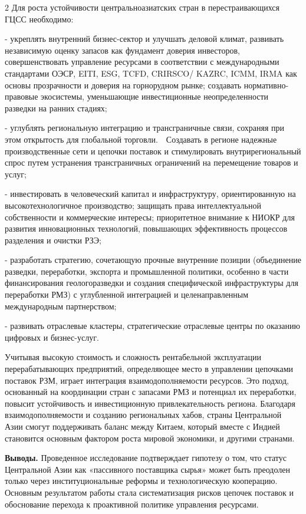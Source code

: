 \begin{multicols}{2}
Для роста устойчивости центральноазиатских стран в перестраивающихся
ГЦСС необходимо:

- укреплять внутренний бизнес-сектор и улучшать деловой климат,
развивать независимую оценку запасов как фундамент доверия инвесторов,
совершенствовать управление ресурсами в соответствии с международными
стандартами ОЭСР, EITI, ESG, TCFD, CRIRSCO/ KAZRC, ICMM, IRMA как основы
прозрачности и доверия на горнорудном рынке; создавать
нормативно-правовые экосистемы, уменьшающие инвестиционные
неопределенности разведки на ранних стадиях;

- углублять региональную интеграцию и трансграничные связи, сохраняя при
этом открытость для глобальной торговли.~~Создавать в регионе надежные
производственные сети и цепочки поставок и стимулировать
внутрирегиональный спрос путем устранения трансграничных ограничений на
перемещение товаров и услуг;

- инвестировать в человеческий капитал и инфраструктуру, ориентированную
на высокотехнологичное производство; защищать права интеллектуальной
собственности и коммерческие интересы; приоритетное внимание к НИОКР для
развития инновационных технологий, повышающих эффективность процессов
разделения и очистки РЗЭ;

- разработать стратегию, сочетающую прочные внутренние позиции
(объединение разведки, переработки, экспорта и промышленной политики,
особенно в части финансирования геологоразведки и создания специфической
инфраструктуры для переработки РМЗ) с углубленной интеграцией и
целенаправленным международным партнерством;

- развивать отраслевые кластеры, стратегические отраслевые центры по
оказанию цифровых и бизнес-услуг.

Учитывая высокую стоимость и сложность рентабельной эксплуатации
перерабатывающих предприятий, определяющее место в управлении цепочками
поставок РЗМ, играет интеграция взаимодополняемости ресурсов. Это
подход, основанный на координации стран с запасами РМЗ и потенциал их
переработки, повысит устойчивость и инвестиционную привлекательность
региона. Благодаря взаимодополняемости и созданию региональных хабов,
страны Центральной Азии смогут поддерживать баланс между Китаем, который
вместе с Индией становится основным фактором роста мировой экономики, и
другими странами.

{\bfseries Выводы.} Проведенное исследование подтверждает гипотезу о том,
что статус Центральной Азии как «пассивного поставщика сырья» может быть
преодолен только через институциональные реформы и технологическую
кооперацию. Основным результатом работы стала систематизация рисков
цепочек поставок и обоснование перехода к проактивной политике
управления ресурсами.


\end{multicols}
